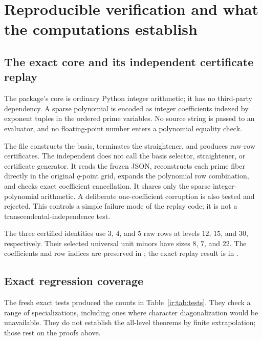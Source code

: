 \section{Reproducible verification and what the computations establish}
\label{ir:sec:verification}

\subsection{The exact core and its independent certificate replay}
The package's core is ordinary Python integer arithmetic; it has no
third-party dependency. A sparse polynomial is encoded as integer
coefficients indexed by exponent tuples in the ordered prime variables.
No source string is passed to an evaluator, and no floating-point number
enters a polynomial equality check.

The file  constructs the basis, terminates the
straightener, and produces raw-row certificates. The independent
 does not call the basis selector,
straightener, or certificate generator. It reads the frozen JSON,
reconstructs each prime fiber directly in the original $q$-point grid,
expands the polynomial row combination, and checks exact coefficient
cancellation. It shares only the sparse integer-polynomial arithmetic.
A deliberate one-coefficient corruption is also tested and rejected.
This controls a simple failure mode of the replay code; it is not a
transcendental-independence test.

The three certified identities use $3$, $4$, and $5$ raw rows at
levels $12$, $15$, and $30$, respectively. Their selected universal
unit minors have sizes $8$, $7$, and $22$. The coefficients and row
indices are preserved in
; the exact replay result is in
.

\subsection{Exact regression coverage}
The fresh exact tests produced the counts in
Table~\ref{ir:tab:tests}. They check a range of specializations,
including ones where character diagonalization would be unavailable.
They do not establish the all-level theorems by finite extrapolation;
those rest on the proofs above.

